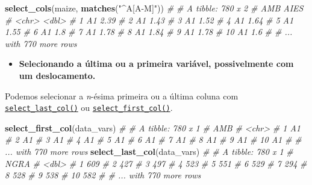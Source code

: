 \documentclass[
]{book}
\newenvironment{Shaded}{\begin{snugshade}}{\end{snugshade}}
\newcommand{\CommentTok}[1]{\textcolor[rgb]{0.56,0.35,0.01}{\textit{#1}}}
\newcommand{\KeywordTok}[1]{\textcolor[rgb]{0.13,0.29,0.53}{\textbf{#1}}}
\newcommand{\NormalTok}[1]{#1}
\newcommand{\StringTok}[1]{\textcolor[rgb]{0.31,0.60,0.02}{#1}}
\providecommand{\tightlist}{%
  \setlength{\itemsep}{0pt}\setlength{\parskip}{0pt}}
\begin{document}
\begin{Shaded}
\begin{Highlighting}[]
\KeywordTok{select_cols}\NormalTok{(maize, }\KeywordTok{matches}\NormalTok{(}\StringTok{"^A[A-M]"}\NormalTok{))}
\CommentTok{# # A tibble: 780 x 2}
\CommentTok{#    AMB    AIES}
\CommentTok{#    <chr> <dbl>}
\CommentTok{#  1 A1     2.39}
\CommentTok{#  2 A1     1.43}
\CommentTok{#  3 A1     1.52}
\CommentTok{#  4 A1     1.64}
\CommentTok{#  5 A1     1.55}
\CommentTok{#  6 A1     1.8 }
\CommentTok{#  7 A1     1.78}
\CommentTok{#  8 A1     1.84}
\CommentTok{#  9 A1     1.78}
\CommentTok{# 10 A1     1.6 }
\CommentTok{# # ... with 770 more rows}
\end{Highlighting}
\end{Shaded}

\begin{itemize}
\tightlist
\item
  \textbf{Selecionando a última ou a primeira variável, possivelmente com um deslocamento.}
\end{itemize}

Podemos selecionar a \emph{n}-ésima primeira ou a última coluna com \href{https://tiagoolivoto.github.io/metan/reference/utils_rows_cols.html}{\texttt{select\_last\_col()}} ou \href{https\%20:\%20//tiagoolivoto.github.io/metan/reference/utils_rows_cols.html}{\texttt{select\_first\_col()}}.

\begin{Shaded}
\begin{Highlighting}[]
\KeywordTok{select_first_col}\NormalTok{(data_vars)}
\CommentTok{# # A tibble: 780 x 1}
\CommentTok{#    AMB  }
\CommentTok{#    <chr>}
\CommentTok{#  1 A1   }
\CommentTok{#  2 A1   }
\CommentTok{#  3 A1   }
\CommentTok{#  4 A1   }
\CommentTok{#  5 A1   }
\CommentTok{#  6 A1   }
\CommentTok{#  7 A1   }
\CommentTok{#  8 A1   }
\CommentTok{#  9 A1   }
\CommentTok{# 10 A1   }
\CommentTok{# # ... with 770 more rows}
\KeywordTok{select_last_col}\NormalTok{(data_vars)}
\CommentTok{# # A tibble: 780 x 1}
\CommentTok{#     NGRA}
\CommentTok{#    <dbl>}
\CommentTok{#  1   609}
\CommentTok{#  2   427}
\CommentTok{#  3   497}
\CommentTok{#  4   523}
\CommentTok{#  5   551}
\CommentTok{#  6   529}
\CommentTok{#  7   294}
\CommentTok{#  8   528}
\CommentTok{#  9   538}
\CommentTok{# 10   582}
\CommentTok{# # ... with 770 more rows}
\end{Highlighting}
\end{Shaded}
\end{document}
